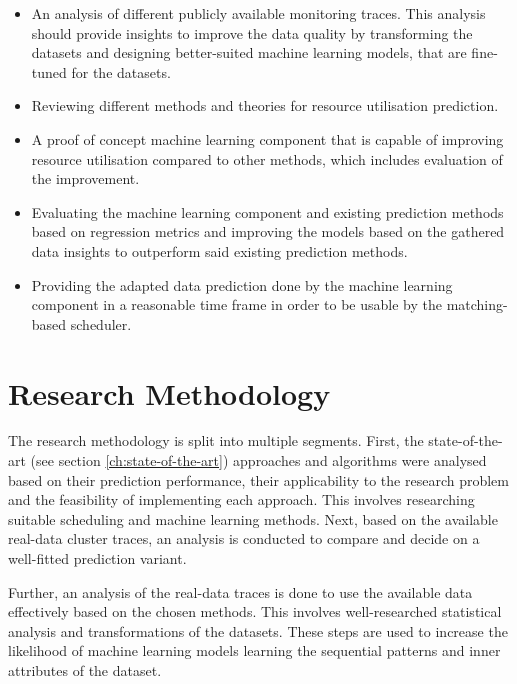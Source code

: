             \begin{itemize}
                \item An analysis of different publicly available monitoring traces. This analysis should provide insights to improve the data quality by transforming the datasets and designing better-suited machine learning models, that are fine-tuned for the datasets.
                
                \item Reviewing different methods and theories for resource utilisation prediction. 
                \item A proof of concept machine learning component that is capable of improving resource utilisation compared to other methods, which includes evaluation of the improvement. 
                \item Evaluating the machine learning component and existing prediction methods based on regression metrics and improving the models based on the gathered data insights to outperform said existing prediction methods.
                \item Providing the adapted data prediction done by the machine learning component in a reasonable time frame in order to be usable by the matching-based scheduler. 
                
            \end{itemize}
            
        \section{Research Methodology}
        \label{sec:research-methodology-introduction}

            The research methodology is split into multiple segments.
            First, the state-of-the-art (see section \ref{ch:state-of-the-art}) approaches and algorithms were analysed based on their prediction performance, their applicability to the research problem and the feasibility of implementing each approach. This involves researching suitable scheduling and machine learning methods. Next, based on the available real-data cluster traces, an analysis is conducted to compare and decide on a well-fitted prediction variant.

            Further, an analysis of the real-data traces is done to use the available data effectively based on the chosen methods.
            This involves well-researched statistical analysis and transformations of the datasets. These steps are used to increase the likelihood of machine learning models learning the sequential patterns and inner attributes of the dataset.

